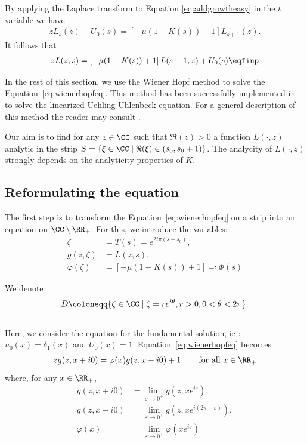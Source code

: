 By applying the Laplace transform to Equation \eqref{eq:addgrowtheasy} in the $t$ variable we have 
\begin{align*}
    zL_s(z) - U_0(s) = \left[- \mu (1-K(s)) + 1\right] L_{s+1}(z).
\end{align*}
It follows that 
\begin{align}
    \label{eq:wienerhopfeq}
    zL(z,s) = \left[- \mu (1-K(s)) + 1\right] L(s+1,z) + U_0(s)
    \eqfinp
\end{align} 


In the rest of this section, we use the Wiener Hopf method to solve the Equation~\eqref{eq:wienerhopfeq}. This method has been successfully implemented in \cite{escobedo2007fundamental} to solve the linearized Uehling-Uhlenbeck equation. For a general description of this method the reader may consult \cite{zakharov2012kolmogorov}. 
\medskip

Our aim is to find for any $z \in \CC$ such that $\Re(z) > 0$ a function $L(\cdot,z)$ analytic in the strip $S = \{\xi \in \CC \mid \Re(\xi) \in (s_0, s_0+1)\}$. 
The analycity of $L(\cdot,z)$ strongly depends on the analyticity properties of $K$.\\



\subsection{Reformulating the equation}

The first step is to transform the Equation~\eqref{eq:wienerhopfeq} on a strip into an equation on $\CC \setminus \RR_+$. For this, we introduce the variables:
    \begin{align}
        \zeta &= T(s) = e^{2i\pi(s-s_0)},\\
        g(z,\zeta) &= L(z,s), \\
        \tilde \varphi(\zeta) &= \left[- \mu (1-K(s)) + 1\right] \eqqcolon 
        \Phi(s)
        \label{def:Phi}
    \end{align}

We denote 
\begin{equation}\label{def:D}
D \coloneqq \{ \zeta \in \CC \mid \zeta = re^{i\theta}, r > 0, 0 < \theta < 2\pi \}.
\end{equation}\\

Here, we consider the equation for the fundamental solution, ie : $u_0(x) = \delta_1(x)$ and $U_0(x) = 1$. Equation~\eqref{eq:wienerhopfeq} becomes
\begin{align}
    \label{eq:WH3.5}
    z g(z, x+i0) = \varphi(x)g(z, x-i0) + 1 \, \qquad \text{for all $x\in\RR_+$}
\end{align}
where, for any $x \in \RR_+$, 
\begin{align*}
    g(z, x+i0) &= \lim_{\varepsilon\to 0^+}  g(z, xe^{i\varepsilon}),\\
    g(z, x-i0) &= \lim_{\varepsilon\to 0^+}  g(z, xe^{i(2\pi-\varepsilon)}),\\
    \varphi(x) &= \lim_{\varepsilon\to 0^+}\tilde \varphi(xe^{i\varepsilon}) 
\end{align*}

